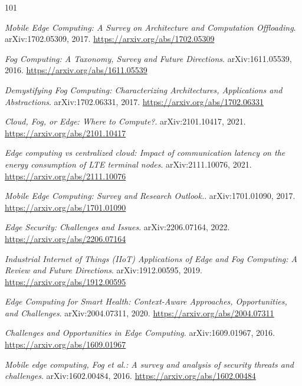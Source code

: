 \documentclass[11pt,a4paper]{article}
\begin{document}
\begin{thebibliography}{101}
\setlength{\itemsep}{2pt}

\newblock \emph{Mobile Edge Computing: A Survey on Architecture and Computation Offloading}.
\newblock arXiv:1702.05309, 2017.
\newblock \url{https://arxiv.org/abs/1702.05309}

\newblock \emph{Fog Computing: A Taxonomy, Survey and Future Directions}.
\newblock arXiv:1611.05539, 2016.
\newblock \url{https://arxiv.org/abs/1611.05539}

\newblock \emph{Demystifying Fog Computing: Characterizing Architectures, Applications and Abstractions}.
\newblock arXiv:1702.06331, 2017.
\newblock \url{https://arxiv.org/abs/1702.06331}

\newblock \emph{Cloud, Fog, or Edge: Where to Compute?}.
\newblock arXiv:2101.10417, 2021.
\newblock \url{https://arxiv.org/abs/2101.10417}

\newblock \emph{Edge computing vs centralized cloud: Impact of communication latency on the energy consumption of LTE terminal nodes}.
\newblock arXiv:2111.10076, 2021.
\newblock \url{https://arxiv.org/abs/2111.10076}

\newblock \emph{Mobile Edge Computing: Survey and Research Outlook.}.
\newblock arXiv:1701.01090, 2017.
\newblock \url{https://arxiv.org/abs/1701.01090}

\newblock \emph{Edge Security: Challenges and Issues}.
\newblock arXiv:2206.07164, 2022.
\newblock \url{https://arxiv.org/abs/2206.07164}

\newblock \emph{Industrial Internet of Things (IIoT) Applications of Edge and Fog Computing: A Review and Future Directions}.
\newblock arXiv:1912.00595, 2019.
\newblock \url{https://arxiv.org/abs/1912.00595}

\newblock \emph{Edge Computing for Smart Health: Context-Aware Approaches, Opportunities, and Challenges}.
\newblock arXiv:2004.07311, 2020.
\newblock \url{https://arxiv.org/abs/2004.07311}

\newblock \emph{Challenges and Opportunities in Edge Computing}.
\newblock arXiv:1609.01967, 2016.
\newblock \url{https://arxiv.org/abs/1609.01967}

\newblock \emph{Mobile edge computing, Fog et al.: A survey and analysis of security threats and challenges}.
\newblock arXiv:1602.00484, 2016.
\newblock \url{https://arxiv.org/abs/1602.00484}


\end{thebibliography}
\end{document}
